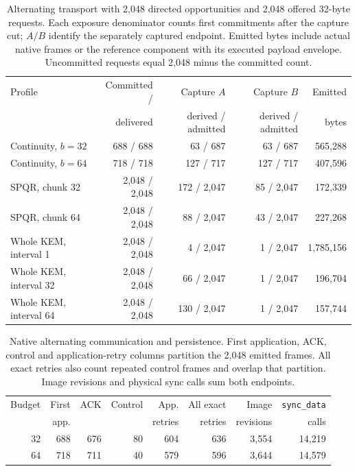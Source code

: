 \begin{table}[t]
\centering
\small
\setlength{\tabcolsep}{3.5pt}
\begin{tabular}{@{}lrrrr@{}}
\toprule
Profile & Committed / & Capture $A$ & Capture $B$ & Emitted\\
 & delivered & derived / admitted & derived / admitted & bytes\\
\midrule
Continuity, $b=32$ & 688 / 688 & 63 / 687 & 63 / 687 & 565,288\\
Continuity, $b=64$ & 718 / 718 & 127 / 717 & 127 / 717 & 407,596\\
SPQR, chunk 32 & 2,048 / 2,048 & 172 / 2,047 & 85 / 2,047 & 172,339\\
SPQR, chunk 64 & 2,048 / 2,048 & 88 / 2,047 & 43 / 2,047 & 227,268\\
Whole KEM, interval 1 & 2,048 / 2,048 & 4 / 2,047 & 1 / 2,047 & 1,785,156\\
Whole KEM, interval 32 & 2,048 / 2,048 & 66 / 2,047 & 1 / 2,047 & 196,704\\
Whole KEM, interval 64 & 2,048 / 2,048 & 130 / 2,047 & 1 / 2,047 & 157,744\\
\bottomrule
\end{tabular}
\caption{Alternating transport with 2,048 directed opportunities and 2,048 offered 32-byte requests. Each exposure denominator counts first commitments after the capture cut; $A/B$ identify the separately captured endpoint. Emitted bytes include actual native frames or the reference component with its executed payload envelope. Uncommitted requests equal 2,048 minus the committed count.}
\label{tab:matched-opportunities}
\end{table}

\begin{table}[t]
\centering
\small
\setlength{\tabcolsep}{4pt}
\begin{tabular}{@{}rrrrrrrr@{}}
\toprule
Budget & First & ACK & Control & App. & All exact & Image & \texttt{sync\_data}\\
 & app. & & & retries & retries & revisions & calls\\
\midrule
32 & 688 & 676 & 80 & 604 & 636 & 3,554 & 14,219\\
64 & 718 & 711 & 40 & 579 & 596 & 3,644 & 14,579\\
\bottomrule
\end{tabular}
\caption{Native alternating communication and persistence. First application, ACK, control and application-retry columns partition the 2,048 emitted frames. All exact retries also count repeated control frames and overlap that partition. Image revisions and physical sync calls sum both endpoints.}
\label{tab:matched-accounting}
\end{table}


